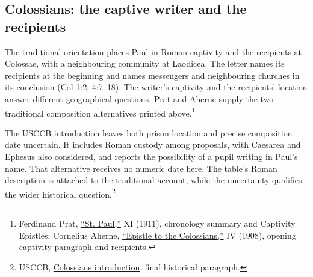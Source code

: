 \subsection{Colossians: the captive writer and the recipients}
\label{hist-colossians}
The traditional orientation places Paul in Roman captivity and the
recipients at Colossae, with a neighbouring community at Laodicea.
The letter names its recipients at the beginning and names messengers
and neighbouring churches in its conclusion (Col 1:2; 4:7--18).
The writer's captivity and the recipients' location answer different
geographical questions. Prat and Aherne supply the two traditional
composition alternatives printed above.\footnote{Ferdinand Prat,
\href{https://www.newadvent.org/cathen/11567b.htm}{``St. Paul,''}
 XI (1911), chronology summary and Captivity
Epistles; Cornelius Aherne,
\href{https://www.newadvent.org/cathen/04131b.htm}{``Epistle to the
Colossians,''} IV (1908), opening captivity paragraph and recipients.}

The USCCB introduction leaves both prison location and precise composition
date uncertain. It includes Roman custody among proposals, with Caesarea
and Ephesus also considered, and reports the possibility of a pupil
writing in Paul's name. That alternative receives no numeric date here.
The table's Roman description is attached to the traditional account,
while the uncertainty qualifies the wider historical question.\footnote{USCCB,
\href{https://bible.usccb.org/bible/colossians/0}{Colossians introduction},
final historical paragraph.}
